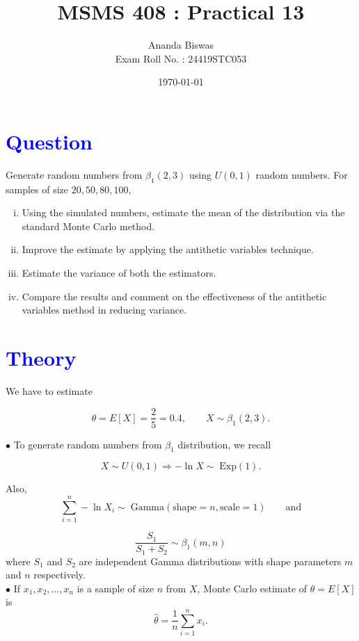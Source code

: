 \documentclass[11pt, a4paper]{article}\usepackage[]{graphicx}\usepackage[]{xcolor}
\title{MSMS 408 : Practical 13}
\author{{\fontsize{25}{20} \benyorithafont Ananda Biswas} \\[1em] Exam Roll No. : 24419STC053}
\date{\today}
\begin{document}
\maketitle


\section*{\faArrowAltCircleRight[regular] \textcolor{blue}{Question}}

\hspace{1cm} Generate random numbers from $\beta_1(2, 3)$ using $U(0, 1)$ random numbers. For samples of size $20, 50, 80, 100$, 

\begin{enumerate}[(i)]
\item Using the simulated numbers, estimate the mean of the distribution via the standard Monte Carlo method.

\item Improve the estimate by applying the antithetic variables technique.

\item Estimate the variance of both the estimators.

\item Compare the results and comment on the effectiveness of the antithetic variables method in reducing variance.
\end{enumerate}

\section*{\faArrowAltCircleRight[regular] \textcolor{blue}{Theory}}

We have to estimate

$$\theta = E[X] = \dfrac{2}{5} = 0.4, \qquad X \sim \beta_1(2, 3).$$

$\bullet$ To generate random numbers from $\beta_1$ distribution, we recall

$$X \sim U(0, 1) \Rightarrow - \ln X \sim \; \text{Exp}(1).$$

Also, $$\sum \limits_{i = 1}^{n} - \ln X_i \sim \; \text{Gamma}(\text{shape} = n, \text{scale} = 1) \qquad \text{and}$$

$$\dfrac{S_1}{S_1 + S_2} \sim \beta_1(m, n)$$
where $S_1$ and $S_2$ are independent Gamma distributions with shape parameters $m$ and $n$ respectively. \\[0.5em]

$\bullet$ If $x_1, x_2, \ldots, x_n$ is a sample of size $n$ from $X$, Monte Carlo estimate of $\theta = E[X]$ is $$\widehat{\theta} = \dfrac{1}{n} \sum \limits_{i = 1}^{n} x_i.$$
\end{document}
